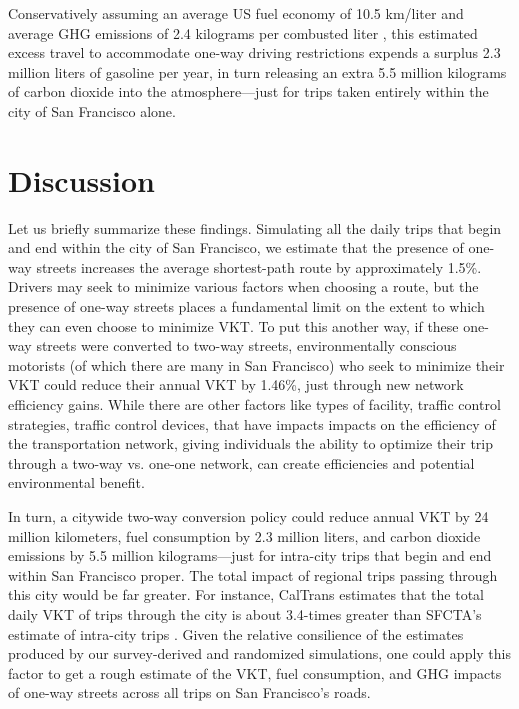 \documentclass{article}
\begin{document}
Conservatively assuming an average US fuel economy of 10.5 km/liter \citep{shepherdson_u.s._2018} and average GHG emissions of 2.4 kilograms per combusted liter \citep{us_department_of_energy_how_2018}, this estimated excess travel to accommodate one-way driving restrictions expends a surplus 2.3 million liters of gasoline per year, in turn releasing an extra 5.5 million kilograms of carbon dioxide into the atmosphere---just for trips taken entirely within the city of San Francisco alone.


\section{Discussion}

Let us briefly summarize these findings. Simulating all the daily trips that begin and end within the city of San Francisco, we estimate that the presence of one-way streets increases the average shortest-path route by approximately 1.5\%. Drivers may seek to minimize various factors when choosing a route, but the presence of one-way streets places a fundamental limit on the extent to which they can even choose to minimize VKT. To put this another way, if these one-way streets were converted to two-way streets, environmentally conscious motorists (of which there are many in San Francisco) who seek to minimize their VKT could reduce their annual VKT by 1.46\%, just through new network efficiency gains. While there are other factors like types of facility, traffic control strategies, traffic control devices, that have impacts impacts on the efficiency of the transportation network, giving individuals the ability to optimize their trip through a two-way vs. one-one network, can create efficiencies and potential environmental benefit. 

In turn, a citywide two-way conversion policy could reduce annual VKT by 24 million kilometers, fuel consumption by 2.3 million liters, and carbon dioxide emissions by 5.5 million kilograms---just for intra-city trips that begin and end within San Francisco proper. The total impact of regional trips passing through this city would be far greater. For instance, CalTrans estimates that the total daily VKT of trips through the city is about 3.4-times greater than SFCTA's estimate of intra-city trips \citep{caltrans_2017_2018}. Given the relative consilience of the estimates produced by our survey-derived and randomized simulations, one could apply this factor to get a rough estimate of the VKT, fuel consumption, and GHG impacts of one-way streets across all trips on San Francisco's roads.
\end{document}

